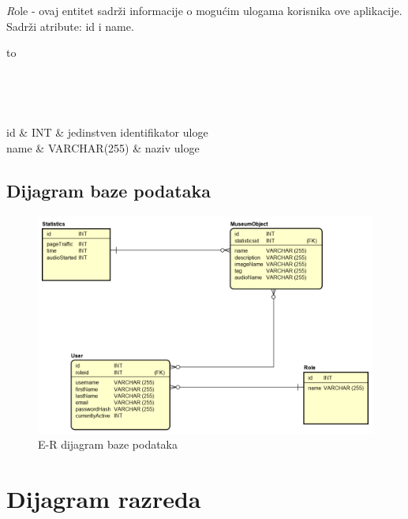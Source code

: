 	\textit Role - ovaj entitet sadrži informacije o mogućim ulogama korisnika ove aplikacije. Sadrži atribute: id i name.
	
	\begin{longtabu} to \textwidth {|X[6, l]|X[6, l]|X[20, l]|}
		
		\hline {}	 \\[3pt] \hline
		\endfirsthead
		
		\hline {}	 \\[3pt] \hline
		\endhead
		
		\hline 
		\endlastfoot
		
		id & INT	&  	jedinstven identifikator uloge 	\\ \hline
		name	& VARCHAR(255) &  naziv uloge 	\\ \hline 		
		
	\end{longtabu}
	
	
			
			\newpage
			\subsection{Dijagram baze podataka}
				
				\begin{figure}[H]
					\includegraphics[scale=0.6]{slike/ER_Dijagram.png}
					\centering
					\caption{E-R dijagram baze podataka}
					\label{fig:promjene}
				\end{figure}
			
			\eject
			
			
		\section{Dijagram razreda}
		
